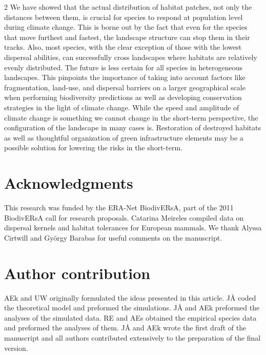 \documentclass[12pt,pdftex]{article}
\begin{document}
\begin{spacing}{2}
We have showed that the actual distribution of habitat patches, not only the distances between them, is crucial for species to respond at population level during climate change. This is borne out by the fact that even for the species that move furthest and fastest, the landscape structure can stop them in their tracks. Also, most species, with the clear exception of those with the lowest dispersal abilities, can successfully cross landscapes where habitats are relatively evenly distributed. The future is less certain for all species in heterogeneous landscapes.%
This pinpoints the importance of taking into account factors like fragmentation, land-use, and dispersal barriers on a larger geographical scale when performing biodiversity predictions as well as developing conservation strategies in the light of climate change. While the speed and amplitude of climate change is something we cannot change in the short-term perspective, the configuration of the landscape in many cases is. Restoration of destroyed habitats as well as thoughtful organization of green infrastructure elements \citep{Benedict2006} may be a possible solution for lowering the risks in the short-term.


\section*{Acknowledgments}
This research was funded by the ERA-Net BiodivERsA, part of the 2011 BiodivERsA call for research proposals. Catarina Meireles compiled data on dispersal kernels and habitat tolerances for European mammals. We thank Alyssa Cirtwill and Gy\"{o}rgy Barabas for useful comments on the manuscript. 

%
     

%

 
\clearpage

\section*{Author contribution}
AEk and UW originally formulated the ideas presented in this article. J\r{A} coded the theoretical model and preformed the simulations. J\r{A} and AEk preformed the analyses of the simulated data. RE and AEs obtained the empirical species data and preformed the  analyses of them. J\r{A} and AEk wrote the first draft of the manuscript and all authors contributed extensively to the preparation of the final version.


\end{spacing}
\end{document}
